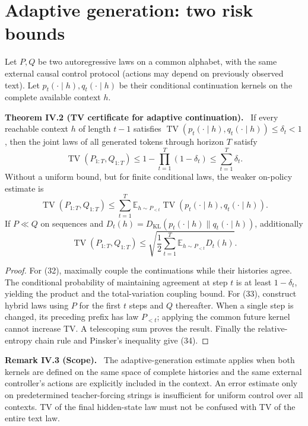 \documentclass[11pt,a4paper,oneside]{book}
\newcommand{\statement}[3]{\par\medskip\noindent\textbf{#1 #2 (#3).}\ }
\begin{document}
\section*{Adaptive generation: two risk bounds}
Let $P,Q$ be two autoregressive laws on a common alphabet, with the same external causal control protocol (actions may depend on previously observed text). Let $p_t(\cdot\mid h),q_t(\cdot\mid h)$ be their conditional continuation kernels on the complete available context $h$.
\statement{Theorem}{IV.2}{TV certificate for adaptive continuation} If every reachable context $h$ of length $t-1$ satisfies $\operatorname{TV}(p_t(\cdot\mid h),q_t(\cdot\mid h))\le\delta_t<1$, then the joint laws of all generated tokens through horizon $T$ satisfy
\begin{equation}\operatorname{TV}(P_{1:T},Q_{1:T})\le1-\prod_{t=1}^T(1-\delta_t)\le\sum_{t=1}^T\delta_t.\tag{32}\end{equation}
Without a uniform bound, but for finite conditional laws, the weaker on-policy estimate is
\begin{equation}\operatorname{TV}(P_{1:T},Q_{1:T})\le\sum_{t=1}^T\mathbb E_{h\sim P_{<t}}\operatorname{TV}(p_t(\cdot\mid h),q_t(\cdot\mid h)).\tag{33}\end{equation}
If $P\ll Q$ on sequences and $D_t(h)=D_{\mathrm{KL}}(p_t(\cdot\mid h)\|q_t(\cdot\mid h))$, additionally
\begin{equation}\operatorname{TV}(P_{1:T},Q_{1:T})\le\sqrt{\frac12\sum_{t=1}^T\mathbb E_{h\sim P_{<t}}D_t(h)}.\tag{34}\end{equation}
\begin{proof}For (32), maximally couple the continuations while their histories agree. The conditional probability of maintaining agreement at step $t$ is at least $1-\delta_t$, yielding the product and the total-variation coupling bound. For (33), construct hybrid laws using $P$ for the first $t$ steps and $Q$ thereafter. When a single step is changed, its preceding prefix has law $P_{<t}$; applying the common future kernel cannot increase TV. A telescoping sum proves the result. Finally the relative-entropy chain rule and Pinsker's inequality give (34).\end{proof}
\statement{Remark}{IV.3}{Scope} The adaptive-generation estimate applies when both kernels are defined on the same space of complete histories and the same external controller's actions are explicitly included in the context. An error estimate only on predetermined teacher-forcing strings is insufficient for uniform control over all contexts. TV of the final hidden-state law must not be confused with TV of the entire text law.
\end{document}
